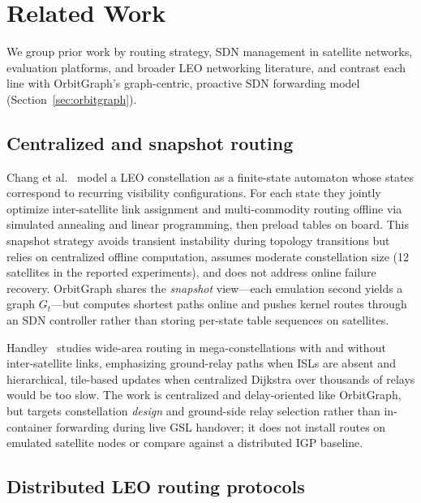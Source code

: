 
\section{Related Work}
\label{sec:related}

We group prior work by routing strategy, SDN management in satellite networks,
evaluation platforms, and broader LEO networking literature, and contrast each
line with OrbitGraph's graph-centric, proactive SDN forwarding model
(Section~\ref{sec:orbitgraph}).

\subsection{Centralized and snapshot routing}

Chang et al.~\cite{seong:topological-design:1995} model a LEO constellation as
a finite-state automaton whose states correspond to recurring visibility
configurations.
For each state they jointly optimize inter-satellite link assignment and
multi-commodity routing offline via simulated annealing and linear programming,
then preload tables on board.
This snapshot strategy avoids transient instability during topology transitions
but relies on centralized offline computation, assumes moderate constellation
size (12 satellites in the reported experiments), and does not address online
failure recovery.
OrbitGraph shares the \emph{snapshot} view---each emulation second yields a graph
$G_t$---but computes shortest paths online and pushes kernel routes through an
SDN controller rather than storing per-state table sequences on satellites.

Handley~\cite{handley:ground-relays:2019} studies wide-area routing in
mega-constellations with and without inter-satellite links, emphasizing
ground-relay paths when ISLs are absent and hierarchical, tile-based updates
when centralized Dijkstra over thousands of relays would be too slow.
The work is centralized and delay-oriented like OrbitGraph, but targets
constellation \emph{design} and ground-side relay selection rather than
in-container forwarding during live GSL handover; it does not install routes on
emulated satellite nodes or compare against a distributed IGP baseline.

\subsection{Distributed LEO routing protocols}

